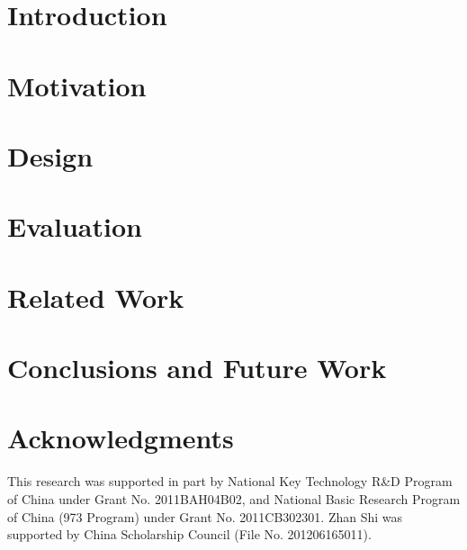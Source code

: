 \documentclass[preprint,12pt]{elsarticle}
\begin{document}

\section{Introduction}
\label{Introduction}

\section{Motivation}

\section{Design}

\section{Evaluation}

\section{Related Work}

\section{Conclusions and Future Work}

\section{Acknowledgments}

This research was supported in part by National Key Technology R\&D Program of China under Grant No. 2011BAH04B02,
and National Basic Research Program of China (973 Program) under Grant No. 2011CB302301.
Zhan Shi was supported by China Scholarship Council (File No. 201206165011).



\end{document}
